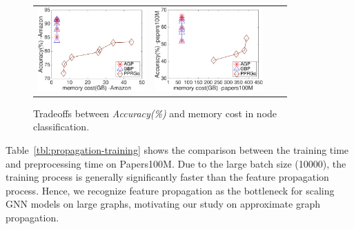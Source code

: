 \begin{figure}[t]
	\begin{small}
		\centering
		\begin{tabular}{cccc}
			\hspace{-3mm} \includegraphics[height=32mm]{./Figs/GNN-accuracy-memory-Amazon.eps} &
			\hspace{-1mm} \includegraphics[height=32mm]{./Figs/GNN-accuracy-memory-papers100M.eps} 
		\end{tabular}
		\vspace{-5mm}
		\caption{Tradeoffs between {\em Accuracy(\%)} and memory cost in node classification.}
		\label{fig:GNN-accuracy-memory}
		\vspace{-4mm}
	\end{small}
\end{figure}



Table~\ref{tbl:propagation-training} shows the comparison between the training time and preprocessing time on Papers100M. Due to the large batch size (10000), the training process is generally significantly faster than the feature propagation process. Hence, we recognize feature propagation as the bottleneck for scaling GNN models on large graphs, motivating our study on approximate graph propagation.





